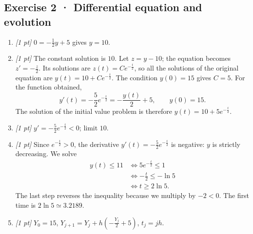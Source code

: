 \subsection*{Exercise 2 · Differential equation and evolution}\begin{enumerate}

\item \textit{[1 pt]} $0=-\frac{1}{2}y+5$ gives $y=10$.

\item \textit{[1 pt]} The constant solution is $10$. Let $z=y-10$; the equation becomes $z'=-\frac{z}{2}$. Its solutions are $z(t)=Ce^{-\frac{t}{2}}$, so all the solutions of the original equation are $y(t)=10+Ce^{-\frac{t}{2}}$.
The condition $y(0)=15$ gives $C=5$. For the function obtained,
\[y'(t)=-\frac{5}{2}e^{-\frac{t}{2}}=-\frac{y(t)}{2}+5,\qquad y(0)=15.\]
The solution of the initial value problem is therefore $y(t)=10+5e^{-\frac{t}{2}}$.

\item \textit{[1 pt]} $y'=-\frac{5}{2}e^{-\frac{t}{2}}<0$; limit $10$.

\item \textit{[1 pt]} Since $e^{-\frac{t}{2}}>0$, the derivative $y'(t)=-\frac{5}{2}e^{-\frac{t}{2}}$ is negative: $y$ is strictly decreasing. We solve
\[\begin{aligned}y(t)\le 11&\Longleftrightarrow 5e^{-\frac{t}{2}}\le1\\&\Longleftrightarrow -\frac{t}{2}\le-\ln 5\\&\Longleftrightarrow t\ge 2\ln 5.\end{aligned}\]
The last step reverses the inequality because we multiply by $-2<0$. The first time is $2\ln 5\simeq3.2189$.

\item \textit{[1 pt]} $Y_0=15$, $Y_{j+1}=Y_j+h(-\frac{Y_j}{2}+5)$, $t_j=jh$.

\end{enumerate}


